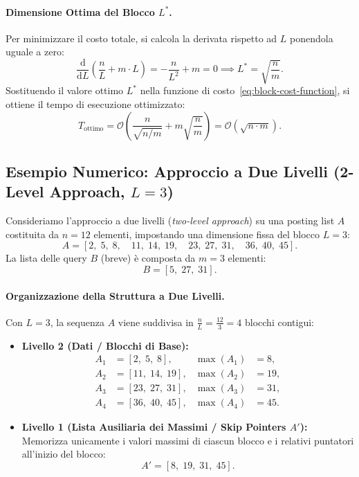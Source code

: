 \paragraph{Dimensione Ottima del Blocco $L^*$.}
Per minimizzare il costo totale, si calcola la derivata rispetto ad $L$ ponendola uguale a zero:
\begin{equation}
  \frac{\mathrm{d}}{\mathrm{d}L}\left(\frac{n}{L} + m \cdot L\right) = -\frac{n}{L^2} + m = 0 \implies L^* = \sqrt{\frac{n}{m}}.
\end{equation}
Sostituendo il valore ottimo $L^*$ nella funzione di costo~\eqref{eq:block-cost-function}, si ottiene il tempo di esecuzione ottimizzato:
\begin{equation}
  T_{\text{ottimo}} = \mathcal{O}\left(\frac{n}{\sqrt{n/m}} + m\sqrt{\frac{n}{m}}\right) = \mathcal{O}\left(\sqrt{n \cdot m}\right).
\end{equation}

\FloatBarrier
\subsection{Esempio Numerico: Approccio a Due Livelli (2-Level Approach, $L = 3$)}
\label{sec:2level-example}
Consideriamo l'approccio a due livelli (\textit{two-level approach}) su una posting list $A$ costituita da $n = 12$ elementi, impostando una dimensione fissa del blocco $L = 3$:
\begin{equation}
  A = [2, \; 5, \; 8, \quad 11, \; 14, \; 19, \quad 23, \; 27, \; 31, \quad 36, \; 40, \; 45].
\end{equation}
La lista delle query $B$ (breve) \`e composta da $m = 3$ elementi:
\begin{equation}
  B = [5, \; 27, \; 31].
\end{equation}

\paragraph{Organizzazione della Struttura a Due Livelli.}
Con $L = 3$, la sequenza $A$ viene suddivisa in $\frac{n}{L} = \frac{12}{3} = 4$ blocchi contigui:
\begin{itemize}
  \item \textbf{Livello 2 (Dati / Blocchi di Base):}
  \begin{align*}
    A_1 &= [2, \; 5, \; 8], & \max(A_1) &= 8, \\
    A_2 &= [11, \; 14, \; 19], & \max(A_2) &= 19, \\
    A_3 &= [23, \; 27, \; 31], & \max(A_3) &= 31, \\
    A_4 &= [36, \; 40, \; 45], & \max(A_4) &= 45.
  \end{align*}
  \item \textbf{Livello 1 (Lista Ausiliaria dei Massimi / Skip Pointers $A'$):}
  Memorizza unicamente i valori massimi di ciascun blocco e i relativi puntatori all'inizio del blocco:
  \begin{equation}
    A' = [8, \; 19, \; 31, \; 45].
  \end{equation}
\end{itemize}

